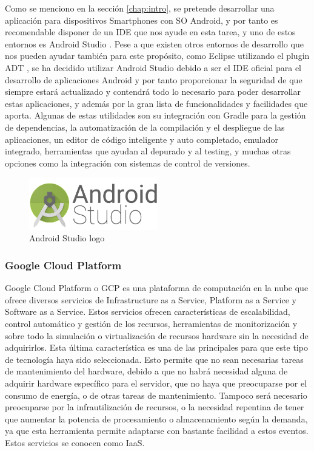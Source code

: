 Como se menciono en la sección \ref{chap:intro}, se pretende desarrollar una aplicación para dispositivos Smartphones con \acs{SO} Android, y por tanto es recomendable disponer de un \acs{IDE} que nos ayude en esta tarea, y uno de estos entornos es Android Studio \cite{AndroidStudio}. Pese a que existen otros entornos de desarrollo que nos pueden ayudar también para este propósito, como Eclipse utilizando el plugin \acs{ADT} \cite{EclipseADT}, se ha decidido utilizar Android Studio debido a ser el \acs{IDE} oficial para el desarrollo de aplicaciones Android y por tanto proporcionar la seguridad de que siempre estará actualizado y contendrá todo lo necesario para poder desarrollar estas aplicaciones, y además por la gran lista de funcionalidades y facilidades que aporta. Algunas de estas utilidades son su integración con Gradle para la gestión de dependencias, la automatización de la compilación y el despliegue de las aplicaciones, un editor de código inteligente y auto completado, emulador integrado, herramientas que ayudan al depurado y al testing, y muchas otras opciones como la integración con sistemas de control de versiones.

\begin{figure}[!h]
\begin{center}
\includegraphics[width=0.5\textwidth]{./figures/android-studio.png}
\caption{Android Studio logo}
\label{fig:android-studio}
\end{center}
\end{figure}

\subsubsection{Google Cloud Platform}
\label{GCP}

Google Cloud Platform o \acs{GCP} es una plataforma de computación en la nube \cite{CloudComputing} que ofrece diversos servicios de Infrastructure as a Service, Platform as a Service y Software as a Service. Estos servicios ofrecen características de escalabilidad, control automático y gestión de los recursos, herramientas de monitorización y sobre todo la simulación o virtualización de recursos hardware sin la necesidad de adquirirlos. Esta última característica es una de las principales para que este tipo de tecnología haya sido seleccionada. Esto permite que no sean necesarias tareas de mantenimiento del hardware, debido a que no habrá necesidad alguna de adquirir hardware específico para el servidor, que no haya que preocuparse por el consumo de energía, o de otras tareas de mantenimiento. Tampoco será necesario preocuparse por la infrautilización de recursos, o la necesidad repentina de tener que aumentar la potencia de procesamiento o almacenamiento según la demanda, ya que esta herramienta permite adaptarse con bastante facilidad a estos eventos. Estos servicios se conocen como \acs{IaaS}.

